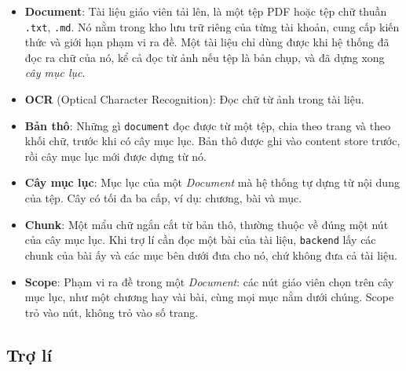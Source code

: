 \begin{itemize}
  \item \textbf{Document}: Tài liệu giáo viên tải lên, là một tệp PDF hoặc tệp chữ thuần
        \texttt{.txt}, \texttt{.md}. Nó nằm trong kho lưu trữ riêng của từng tài khoản, cung cấp kiến
        thức và giới hạn phạm vi ra đề. Một tài liệu chỉ dùng được khi hệ thống đã đọc ra chữ của
        nó, kể cả đọc từ ảnh nếu tệp là bản chụp, và đã dựng xong \emph{cây mục lục}.
  \item \textbf{OCR} (Optical Character Recognition): Đọc chữ từ ảnh trong tài liệu.
  \item \textbf{Bản thô}: Những gì \texttt{document} đọc được từ một tệp, chia theo trang và theo
        khối chữ, trước khi có cây mục lục. Bản thô được ghi vào content store trước, rồi cây mục
        lục mới được dựng từ nó.
  \item \textbf{Cây mục lục}: Mục lục của một \emph{Document} mà hệ thống tự dựng từ nội dung của tệp.
        Cây có tối đa ba cấp, ví dụ: chương, bài và mục.
  \item \textbf{Chunk}: Một mẩu chữ ngắn cắt từ bản thô, thường thuộc về đúng một nút của cây mục
        lục. Khi trợ lí cần đọc một bài của tài liệu, \texttt{backend} lấy các chunk của bài ấy và 
        các mục bên dưới đưa cho nó, chứ không đưa cả tài liệu.
  \item \textbf{Scope}: Phạm vi ra đề trong một \emph{Document}: các nút giáo viên chọn trên cây mục
        lục, như một chương hay vài bài, cùng mọi mục nằm dưới chúng. Scope trỏ vào nút, không trỏ
        vào số trang.
\end{itemize}

\subsection{Trợ lí}

